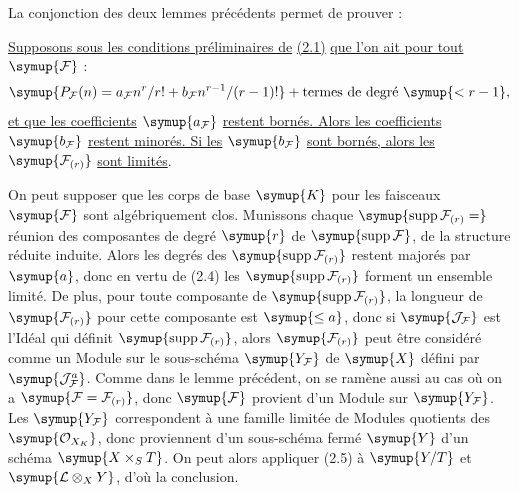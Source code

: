 La conjonction des deux lemmes précédents permet de prouver :

 \uline{Supposons sous les conditions préliminaires de} \uline{(2.1)} \uline{que
l'on ait pour tout} $\symup{\mathcal F}$ :
\[
\symup{P_{\mathcal F}(n)=a_{\mathcal F}n^r/r!+b_{\mathcal F}n^{r-1}/(r-1)!}+\text{termes de degré $\symup{<r-1}$},
\]
\uline{et que les coefficients} $\symup{a_{\mathcal F}}$ \uline{restent bornés. Alors les coefficients}
$\symup{b_{\mathcal F}}$ \uline{restent minorés. Si les} $\symup{b_{\mathcal F}}$ \uline{sont bornés, alors
les} $\symup{\mathcal F_{(r)}}$ \uline{sont limités}.

On peut supposer que les corps de base $\symup{K}$ pour les faisceaux $\symup{\mathcal F}$ sont
algébriquement clos. Munissons chaque
$\symup{\operatorname{supp}\mathcal F_{(r)}=}$ réunion des composantes de degré
$\symup{r}$
de $\symup{\operatorname{supp}\mathcal F}$, de la structure réduite induite. Alors les
degrés des $\symup{\operatorname{supp}\mathcal F_{(r)}}$ restent majorés par $\symup{a}$, donc
en vertu de (2.4) les $\symup{\operatorname{supp}\mathcal F_{(r)}}$ forment un ensemble
limité. De plus, pour toute composante de
$\symup{\operatorname{supp}\mathcal F_{(r)}}$, la longueur de $\symup{\mathcal F_{(r)}}$ pour
cette composante est $\symup{\leq a}$, donc si $\symup{\mathcal J_{\mathcal F}}$ est l'Idéal
qui définit $\symup{\operatorname{supp}\mathcal F_{(r)}}$, alors $\symup{\mathcal F_{(r)}}$
peut être considéré comme un Module sur le sous-schéma $\symup{Y_{\mathcal F}}$ de $\symup{X}$
défini par $\symup{\mathcal J_{\mathcal F}^{a}}$. Comme dans le lemme précédent, on se
ramène aussi au cas où on a $\symup{\mathcal F=\mathcal F_{(r)}}$, donc $\symup{\mathcal F}$
provient d'un Module sur $\symup{Y_{\mathcal F}}$. Les $\symup{Y_{\mathcal F}}$ correspondent à
une famille limitée de Modules quotients des $\symup{\mathcal O_{X_K}}$, donc
proviennent d'un sous-schéma fermé $\symup{Y}$ d'un schéma $\symup{X\times_S T}$. On peut alors
appliquer (2.5) à $\symup{Y/T}$ et $\symup{\mathcal L\otimes_XY}$, d'où la conclusion.

